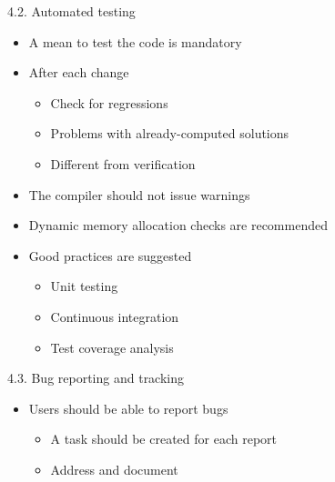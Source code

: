 \documentclass[
  ignorenonframetext,
  aspectratio=169,
]{beamer}
\providecommand{\tightlist}{%
  \setlength{\itemsep}{0pt}\setlength{\parskip}{0pt}}
\begin{document}
\begin{frame}[fragile]{}
\protect\hypertarget{section-12}{}
\begin{columns}[T]
\begin{column}{0.5\textwidth}
\begin{block}{4.2. Automated testing}
\protect\hypertarget{automated-testing}{}
\begin{itemize}
\tightlist
\item
  A mean to test the code is mandatory
\item
  After each change

  \begin{itemize}
  \tightlist
  \item
    Check for regressions
  \item
    Problems with already-computed solutions
  \item
    Different from verification
  \end{itemize}
\item
  The compiler should not issue warnings
\item
  Dynamic memory allocation checks are recommended
\item
  Good practices are suggested

  \begin{itemize}
  \tightlist
  \item
    Unit testing
  \item
    Continuous integration
  \item
    Test coverage analysis
  \end{itemize}
\end{itemize}
\end{block}

\begin{block}{4.3. Bug reporting and tracking}
\protect\hypertarget{bug-reporting-and-tracking}{}
\begin{itemize}
\tightlist
\item
  Users should be able to report bugs

  \begin{itemize}
  \tightlist
  \item
    A task should be created for each report
  \item
    Address and document
  \end{itemize}
\end{itemize}
\end{block}
\end{column}

\pause


\end{columns}
\end{frame}
\end{document}
